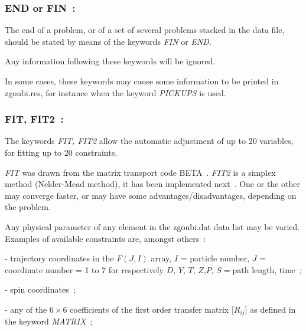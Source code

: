 \newpage

\subsubsection*{END or FIN~: \ENDTitl}  \label{FIN}  \label{END} 
\medskip

The end of a problem, or of a set of several problems stacked in 
the data file, should be stated by means of the keywords \textsl{FIN} or
\textsl{END}.  

\bigskip

\noindent Any information following these keywords will be ignored. 

\bigskip

\noindent In some cases, these keywords may cause some information to be  printed in zgoubi.res, for instance when the 
keyword \textsl{PICKUPS} is used. 

\newpage

\subsubsection*{FIT, FIT2~:  \FITTitl}  \label{FIT}   
\medskip

 The keywords \textsl{FIT, FIT2} allow the automatic adjustment of up to 20 
variables, for fitting up to 20 constraints. 

\medskip 

 \noindent 
\textsl{FIT} was drawn from  the matrix transport code BETA~\cite{Biblio10}. 
\textsl{FIT2} is a simplex method (Nelder-Mead method), it has been implemented  next~\cite{NelderMead}.   
One or the other may converge 
faster, or may have some advantages/disadvantages,  depending on the problem. 

\medskip 
\noindent Any physical parameter of any element in the zgoubi.dat data list may 
be varied. Examples of available constraints  are, amongst others~:  

\noindent -  trajectory coordinates in the  $ F(J,I) $ array, 
$ I $  =  particle number, $ J $  = coordinate number = 1 to 7 for 
respectively $ D$, $Y$, $T$, $Z$,$ P $, $ S= $path length, time~;

\noindent -  spin coordinates~;

\noindent - any of the $6 \times 6$
coefficients of the first order transfer matrix $ \lbrack R_{ij}\rbrack $ as defined in the
keyword \textsl{MATRIX}~; 


